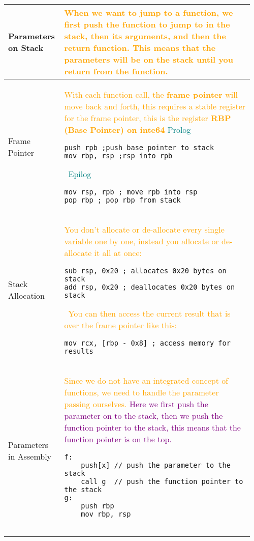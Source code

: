 \documentclass[main.tex,fontsize=8pt,paper=a4,paper=portrait,DIV=calc,]{scrartcl}
\begin{document}
\begin{table}[ht!]
\begin{tabular}{|m{0.2\linewidth}|m{0.755\linewidth}|}
\hline
Parameters on Stack & 
\textcolor{orange}{When we want to jump to a function, we first push the function to jump to in the stack, then its arguments, and then the return function.\newline
This means that the parameters will be on the stack until you return from the function.}\\
\hline
Frame Pointer & 
\textcolor{orange}{With each function call, the \textbf{frame pointer} will move back and forth,\newline
this requires a stable register for the frame pointer, this is the register \textbf{RBP (Base Pointer) on inte64}}\newline
\textcolor{teal}{Prolog}\newline
\begin{lstlisting}
push rpb ;push base pointer to stack
mov rbp, rsp ;rsp into rpb
\end{lstlisting} 
\, \newline
\textcolor{teal}{Epilog}\newline
\begin{lstlisting}
mov rsp, rpb ; move rpb into rsp 
pop rbp ; pop rbp from stack
\end{lstlisting}\\
\hline
Stack Allocation& 
\textcolor{orange}{You don't allocate or de-allocate every single variable one by one, instead you allocate or de-allocate it all at once:}\newline
\begin{lstlisting}
sub rsp, 0x20 ; allocates 0x20 bytes on stack
add rsp, 0x20 ; deallocates 0x20 bytes on stack
\end{lstlisting} 
\, \newline
\textcolor{orange}{You can then access the current result that is over the frame pointer like this:}\newline
\begin{lstlisting}
mov rcx, [rbp - 0x8] ; access memory for results
\end{lstlisting}\\
\hline
Parameters in Assembly & 
\textcolor{orange}{Since we do not have an integrated concept of functions, we need to handle the parameter passing ourselves.}\newline
\textcolor{purple}{Here we first push the parameter on to the stack, then we push the function pointer to the stack, this means that the function pointer is on the top.}\newline
\begin{lstlisting}
f: 
    push[x] // push the parameter to the stack
    call g  // push the function pointer to the stack
g: 
    push rbp 
    mov rbp, rsp 
     

\end{lstlisting}
\end{tabular}
\end{table}
\end{document}
